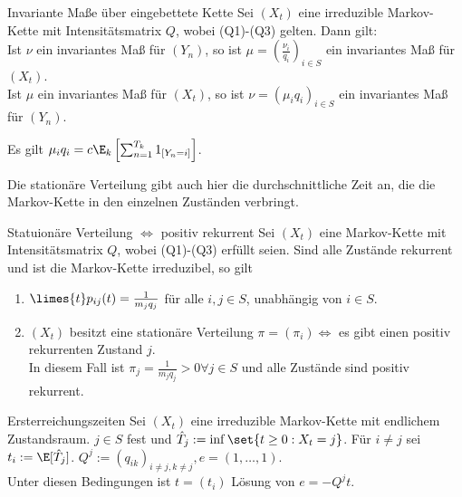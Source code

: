 \begin{karte}{Invariante Maße über eingebettete Kette}
    Sei \((X_t)\) eine irreduzible Markov-Kette 
    mit Intensitätsmatrix \(Q\), wobei (Q1)-(Q3) gelten.
    Dann gilt: \\
    Ist \(\nu\) ein invariantes Maß für \((Y_n)\), so ist 
    \(\mu = (\frac{\nu_i}{q_i})_{i\in S}\) ein invariantes 
    Maß für \((X_t)\).\\
    Ist \(\mu\) ein invariantes Maß für \((X_t)\), so ist 
    \(\nu = (\mu_i q_i)_{i\in S}\) ein invariantes 
    Maß für \((Y_n)\).

    Es gilt \(\mu_i q_i = c\E_k \left[\sum_{n=1}^{T_k} 1_{[Y_n = i]}\right]\).

    Die stationäre Verteilung gibt auch hier die durchschnittliche 
    Zeit an, die die Markov-Kette in den einzelnen Zuständen verbringt.
\end{karte}

\begin{karte}{Statuionäre Verteilung \(\Leftrightarrow\) positiv rekurrent}
    Sei \((X_t)\) eine Markov-Kette mit Intensitätsmatrix 
    \(Q\), wobei (Q1)-(Q3) erfüllt seien. Sind alle 
    Zustände rekurrent und ist die Markov-Kette irreduzibel, so gilt 
    \begin{enumerate}
        \item \( \limes{t} p_{ij}(t) = \frac{1}{m_j q_j} \) für alle \(i,j\in S\), 
        unabhängig von \(i\in S\).
        \item \((X_t)\) besitzt eine stationäre Verteilung \(\pi = (\pi_i) 
        \Leftrightarrow \) es gibt einen positiv rekurrenten Zustand \(j\).\\
        In diesem Fall ist \(\pi_j = \frac{1}{m_j q_j} > 0 \forall j\in S\) 
        und alle Zustände sind positiv rekurrent.
    \end{enumerate}
\end{karte}

\begin{karte}{Ersterreichungszeiten}
    Sei \((X_t)\) eine irreduzible Markov-Kette 
    mit endlichem Zustandsraum. \(j\in S\) fest 
    und \(\hat{T}_j := \inf \set{t\geq 0:X_t = j}\).
    Für \(i\neq j\) sei \(t_i := \E[\hat{T}_j]\).
    \(Q^j := (q_{ik})_{i\neq j,k\neq j}, e = (1,\ldots, 1)\). \\
    Unter diesen Bedingungen ist \(t = (t_i)\) Lösung von 
    \(e=-Q^j t\).
\end{karte}